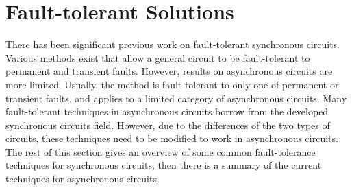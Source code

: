 \documentclass[12pt]{report}
\begin{document}

\section{Fault-tolerant Solutions}

There has been significant previous work on fault-tolerant synchronous circuits.  Various methods exist that allow a general circuit to be fault-tolerant to permanent and transient faults.  However, results on asynchronous circuits are more limited.  Usually, the method is fault-tolerant to only one of permanent or transient faults, and applies to a limited category of asynchronous circuits.  Many fault-tolerant techniques in asynchronous circuits borrow from the developed synchronous circuits field.  However, due to the differences of the two types of circuits, these techniques need to be modified to work in asynchronous circuits.  The rest of this section gives an overview of some common fault-tolerance techniques for synchronous circuits, then there is a summary of the current techniques for asynchronous circuits. \\


\end{document}
